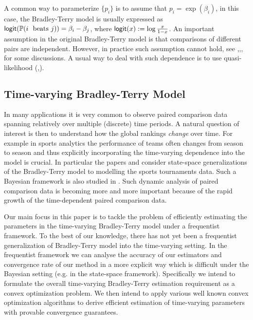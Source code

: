 \documentclass{article}
\begin{document}
A common way to parameterize $\{p_i\}$ is to assume that $p_i = \exp(\beta_i)$, in this case, the Bradley-Terry model is usually expressed as
$\logit(\prob{i\ \text{ beats } j}) = \beta_i - \beta_j$, where ${\sf{logit}}(x) := \log\frac{x}{1-x}$. An important assumption in the original Bradley-Terry model is that comparisons of different pairs are independent. However, in practice such assumption cannot hold, see \cite{BD1997},\cite{DHK2002},\cite{Ct2012},\cite{Va2016} for some discussions. A usual way to deal with such dependence is to use quasi-likelihood (\cite{Wd1974},\cite{Va2016}).

\subsection{Time-varying Bradley-Terry Model}
In many applications it is very common to observe paired comparison data spanning relatively over multiple (discrete) time periods. A natural question of interest is then to understand how the global rankings \textit{change} over time. For example in sports analytics the performance of teams often changes from season to season and thus explicitly incorporating the time-varying dependence into the model is crucial. In particular the papers \cite{FaT1994} and \cite{CMV2012} consider state-space generalizations of the Bradley-Terry model to modelling the sports tournaments data. Such a Bayesian framework is also studied in \cite{Gli1993}. Such dynamic analysis of paired comparison data is becoming more and more important because of the rapid growth of the time-dependent paired comparison data.
\par

Our main focus in this paper is to tackle the problem of efficiently estimating the parameters in the time-varying Bradley-Terry model under a frequentist framework. To the best of our knowledge, there has not yet been a frequentist generalization of Bradley-Terry model into the time-varying setting. In the frequentist framework we can analyse the accuracy of our estimators and convergence rate of our method in a more explicit way which is difficult under the Bayesian setting (e.g. in the state-space framework). Specifically we intend to formulate the overall time-varying Bradley-Terry estimation requirement as a convex optimization problem. We then intend to apply various well known convex optimization algorithms to derive efficient estimation of time-varying parameters with provable convergence guarantees.
\end{document}
